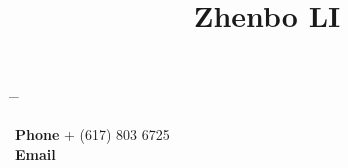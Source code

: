 

\title{Zhenbo LI} %

\vspace{-0.5cm}
\parbox[c][3em][t]{0.9\textwidth}{ %
	\begin{tabbing} %
		\hspace{3cm} \= \hspace{4cm} \= \kill %
		
{\bf Phone} \> + (617) 803 6725 \\ %
{\bf Email} \> 
		
	\end{tabbing}
}

\vspace{-0mm}
